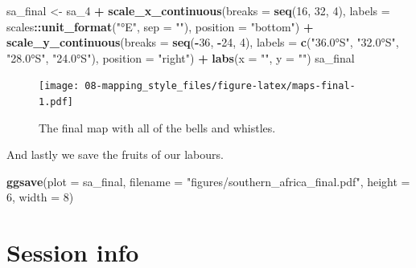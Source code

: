 \documentclass[]{book}
\newenvironment{Shaded}{\begin{snugshade}}{\end{snugshade}}
\newcommand{\KeywordTok}[1]{\textcolor[rgb]{0.13,0.29,0.53}{\textbf{#1}}}
\newcommand{\DataTypeTok}[1]{\textcolor[rgb]{0.13,0.29,0.53}{#1}}
\newcommand{\DecValTok}[1]{\textcolor[rgb]{0.00,0.00,0.81}{#1}}
\newcommand{\StringTok}[1]{\textcolor[rgb]{0.31,0.60,0.02}{#1}}
\newcommand{\OperatorTok}[1]{\textcolor[rgb]{0.81,0.36,0.00}{\textbf{#1}}}
\newcommand{\NormalTok}[1]{#1}
\theoremstyle{definition}
\theoremstyle{definition}
\theoremstyle{definition}
\theoremstyle{remark}
\begin{document}
\begin{Shaded}
\begin{Highlighting}[]
\NormalTok{sa_final <-}\StringTok{ }\NormalTok{sa_}\DecValTok{4} \OperatorTok{+}
\StringTok{  }\KeywordTok{scale_x_continuous}\NormalTok{(}\DataTypeTok{breaks =} \KeywordTok{seq}\NormalTok{(}\DecValTok{16}\NormalTok{, }\DecValTok{32}\NormalTok{, }\DecValTok{4}\NormalTok{),}
                     \DataTypeTok{labels =}\NormalTok{ scales}\OperatorTok{::}\KeywordTok{unit_format}\NormalTok{(}\StringTok{"°E"}\NormalTok{, }\DataTypeTok{sep =} \StringTok{""}\NormalTok{),}
                     \DataTypeTok{position =} \StringTok{"bottom"}\NormalTok{) }\OperatorTok{+}
\StringTok{  }\KeywordTok{scale_y_continuous}\NormalTok{(}\DataTypeTok{breaks =} \KeywordTok{seq}\NormalTok{(}\OperatorTok{-}\DecValTok{36}\NormalTok{, }\OperatorTok{-}\DecValTok{24}\NormalTok{, }\DecValTok{4}\NormalTok{),}
                     \DataTypeTok{labels =} \KeywordTok{c}\NormalTok{(}\StringTok{"36.0°S"}\NormalTok{, }\StringTok{"32.0°S"}\NormalTok{, }\StringTok{"28.0°S"}\NormalTok{, }\StringTok{"24.0°S"}\NormalTok{),}
                     \DataTypeTok{position =} \StringTok{"right"}\NormalTok{) }\OperatorTok{+}
\StringTok{  }\KeywordTok{labs}\NormalTok{(}\DataTypeTok{x =} \StringTok{""}\NormalTok{, }\DataTypeTok{y =} \StringTok{""}\NormalTok{)}
\NormalTok{sa_final}
\end{Highlighting}
\end{Shaded}

\begin{figure}
\centering
\texttt{[image: 08-mapping\_style\_files/figure-latex/maps-final-1.pdf]}
\caption{\label{fig:maps-final}The final map with all of the bells and
whistles.}
\end{figure}

And lastly we save the fruits of our labours.

\begin{Shaded}
\begin{Highlighting}[]
\KeywordTok{ggsave}\NormalTok{(}\DataTypeTok{plot =}\NormalTok{ sa_final, }\DataTypeTok{filename =} \StringTok{"figures/southern_africa_final.pdf"}\NormalTok{, }
       \DataTypeTok{height =} \DecValTok{6}\NormalTok{, }\DataTypeTok{width =} \DecValTok{8}\NormalTok{)}
\end{Highlighting}
\end{Shaded}

\section{Session info}\label{session-info-7}
\end{document}

